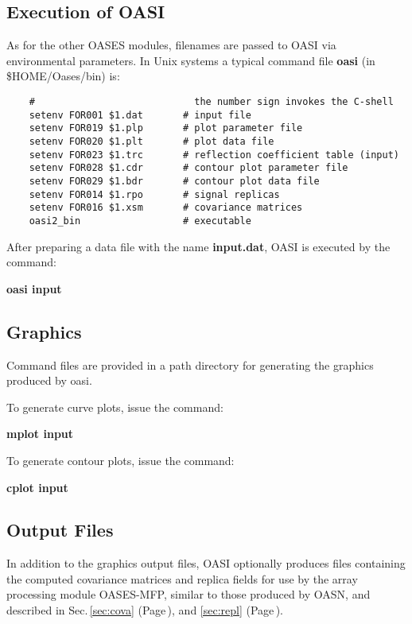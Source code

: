 \subsection{Execution of OASI}

    As  for the other OASES modules,  filenames  are  passed  to OASI   via 
environmental parameters. In Unix systems a typical command  file 
{\bf oasi} (in  \$HOME/Oases/bin) is:

\small
\begin{verbatim}
    #                            the number sign invokes the C-shell 
    setenv FOR001 $1.dat       # input file 
    setenv FOR019 $1.plp       # plot parameter file
    setenv FOR020 $1.plt       # plot data file  
    setenv FOR023 $1.trc       # reflection coefficient table (input)
    setenv FOR028 $1.cdr       # contour plot parameter file 
    setenv FOR029 $1.bdr       # contour plot data file 
    setenv FOR014 $1.rpo       # signal replicas
    setenv FOR016 $1.xsm       # covariance matrices
    oasi2_bin                  # executable
\end{verbatim}
\normalsize

    After preparing a data file with the name {\bf input.dat}, OASI  is 
executed by the command:

    {\bf oasi input}

\subsection{Graphics}  

    Command files are provided in a path directory for generating 
the graphics produced by oasi.

\noindent    To generate curve plots, issue the command:

    {\bf mplot input}

\noindent    To generate contour plots, issue the command:

    {\bf cplot input}


\subsection{Output Files}

In addition to the graphics output files, OASI optionally produces
files containing the computed covariance matrices and replica fields
for use by the array processing module OASES-MFP, similar to those
produced by OASN, and described in Sec.\,\ref{sec:cova} (Page\,\pageref{sec:cova}), and \ref{sec:repl} (Page\,\pageref{sec:repl}).




